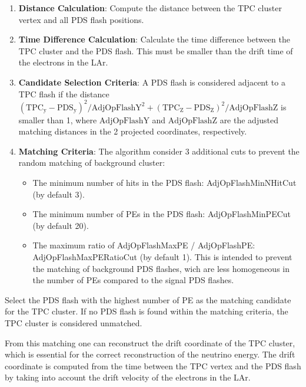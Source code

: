 \begin{enumerate}
    \item\textbf{Distance Calculation}: Compute the distance between the \ac{TPC} cluster vertex and all PDS flash positions.
    \item\textbf{Time Difference Calculation}: Calculate the time difference between the \ac{TPC} cluster and the PDS flash. This must be smaller than the drift time of the electrons in the LAr.
    \item\textbf{Candidate Selection Criteria}: A PDS flash is considered adjacent to a \ac{TPC} flash if the distance $(\text{TPC}_\text{y} - \text{PDS}_\text{y})^2 / \text{AdjOpFlashY}^2 + (\text{TPC}_\text{Z} - \text{PDS}_\text{Z})^2 / \text{AdjOpFlashZ}$ is smaller than 1, where \( \text{AdjOpFlashY} \) and \( \text{AdjOpFlashZ} \) are the adjusted matching distances in the 2 projected coordinates, respectively.
    \item\textbf{Matching Criteria}: The algorithm consider 3 additional cuts to prevent the random matching of background cluster:
    \begin{itemize}
        \item The minimum number of hits in the PDS flash: AdjOpFlashMinNHitCut (by default 3).
        \item The minimum number of PEs in the PDS flash: AdjOpFlashMinPECut (by default 20).
        \item The maximum ratio of AdjOpFlashMaxPE / AdjOpFlashPE: AdjOpFlashMaxPERatioCut (by default 1). This is intended to prevent the matching of background PDS flashes, wich are less homogeneous in the number of PEs compared to the signal PDS flashes.
    \end{itemize}
\end{enumerate}

Select the PDS flash with the highest number of PE as the matching candidate for the \ac{TPC} cluster. If no PDS flash is found within the matching criteria, the \ac{TPC} cluster is considered unmatched.

From this matching one can reconstruct the drift coordinate of the \ac{TPC} cluster, which is essential for the correct reconstruction of the neutrino energy. The drift coordinate is computed from the time between the \ac{TPC} vertex and the PDS flash by taking into account the drift velocity of the electrons in the \ac{LAr}.